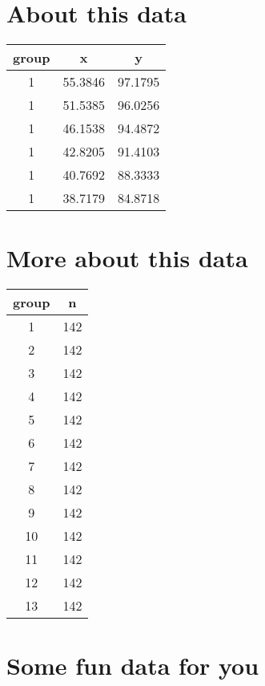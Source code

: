 \documentclass[
]{book}
\begin{document}
\hypertarget{about-this-data}{%
\section{About this data}\label{about-this-data}}

\begin{tabular}{c|c|c}
\hline
group & x & y\\
\hline
1 & 55.3846 & 97.1795\\
\hline
1 & 51.5385 & 96.0256\\
\hline
1 & 46.1538 & 94.4872\\
\hline
1 & 42.8205 & 91.4103\\
\hline
1 & 40.7692 & 88.3333\\
\hline
1 & 38.7179 & 84.8718\\
\hline
\end{tabular}

\hypertarget{more-about-this-data}{%
\section{More about this data}\label{more-about-this-data}}

\begin{tabular}{c|c}
\hline
group & n\\
\hline
1 & 142\\
\hline
2 & 142\\
\hline
3 & 142\\
\hline
4 & 142\\
\hline
5 & 142\\
\hline
6 & 142\\
\hline
7 & 142\\
\hline
8 & 142\\
\hline
9 & 142\\
\hline
10 & 142\\
\hline
11 & 142\\
\hline
12 & 142\\
\hline
13 & 142\\
\hline
\end{tabular}

\hypertarget{some-fun-data-for-you}{%
\section{Some fun data for you}\label{some-fun-data-for-you}}
\end{document}
